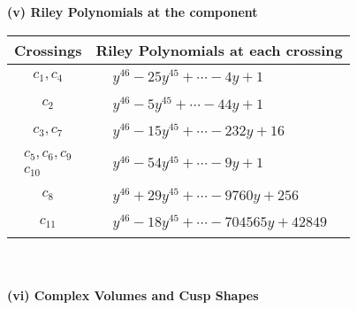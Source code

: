\documentclass[1p]{elsarticle_modified}
\theoremstyle{definition}
\begin{document}
\newpage\renewcommand{\arraystretch}{1}
\flushleft \textbf{(v) Riley Polynomials at the component}\newline \\
\begin{tabular}{m{50pt}|m{274pt}}
Crossings & \hspace{64pt}Riley Polynomials at each crossing \\
\hline $$\begin{aligned}c_{1},c_{4}\end{aligned}$$&$\begin{aligned}
&y^{46}-25 y^{45}+\cdots-4 y+1
\end{aligned}$\\
\hline $$\begin{aligned}c_{2}\end{aligned}$$&$\begin{aligned}
&y^{46}-5 y^{45}+\cdots-44 y+1
\end{aligned}$\\
\hline $$\begin{aligned}c_{3},c_{7}\end{aligned}$$&$\begin{aligned}
&y^{46}-15 y^{45}+\cdots-232 y+16
\end{aligned}$\\
\hline $$\begin{aligned}c_{5},c_{6},c_{9}\\c_{10}\end{aligned}$$&$\begin{aligned}
&y^{46}-54 y^{45}+\cdots-9 y+1
\end{aligned}$\\
\hline $$\begin{aligned}c_{8}\end{aligned}$$&$\begin{aligned}
&y^{46}+29 y^{45}+\cdots-9760 y+256
\end{aligned}$\\
\hline $$\begin{aligned}c_{11}\end{aligned}$$&$\begin{aligned}
&y^{46}-18 y^{45}+\cdots-704565 y+42849
\end{aligned}$\\
\hline
\end{tabular}\\~\\
\newpage\flushleft \textbf{(vi) Complex Volumes and Cusp Shapes}
\end{document}
